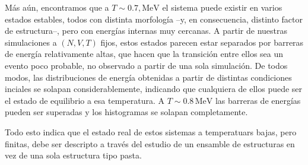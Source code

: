 Más aún, encontramos que a $T\sim0.7,\text{MeV}$ el sistema puede existir en varios estados estables, todos con distinta morfología --y, en consecuencia, distinto factor de estructura--, pero con energías internas muy cercanas.
A partir de nuestras simulaciones a $(N,V,T)$ fijos, estos estados parecen estar separados por barreras de energía relativamente altas, que hacen que la transición entre ellos sea un evento poco probable, no observado a partir de una sola simulación.
De todos modos, las distribuciones de energía obtenidas a partir de distintas condiciones inciales se solapan considerablemente, indicando que cualquiera de ellos puede ser el estado de equilibrio a esa temperatura.
A $T\sim0.8\,\text{MeV}$ las barreras de energías pueden ser superadas y los histogramas se solapan completamente.

Todo esto indica que el estado real de estos sistemas a temperatuars bajas, pero finitas, debe ser descripto a través del estudio de un ensamble de estructuras en vez de una sola estructura tipo pasta.